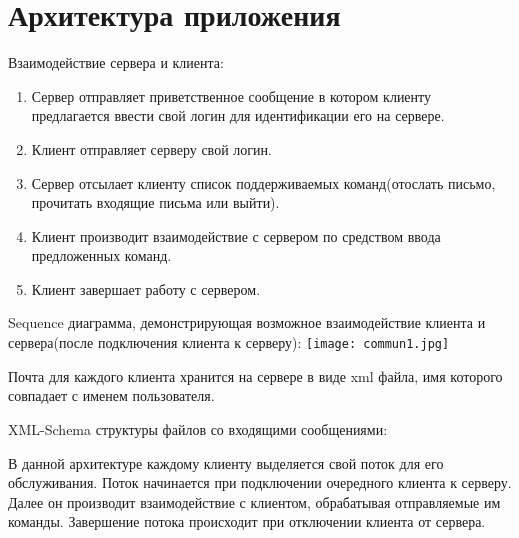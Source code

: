 \documentclass[12pt,a4paper]{report}
\begin{document}
\section{Архитектура приложения}
Взаимодействие сервера и клиента:
\begin{enumerate}
\item Сервер отправляет приветственное сообщение в котором клиенту предлагается ввести свой логин для идентификации его на сервере.
\item Клиент отправляет серверу свой логин.
\item Сервер отсылает клиенту список поддерживаемых команд(отослать письмо, прочитать входящие письма или выйти).
\item Клиент производит взаимодействие с сервером по средством ввода предложенных команд.
\item Клиент завершает работу с сервером.
\end{enumerate}
\pagebreak
\flushleft
Sequence диаграмма, демонстрирующая возможное взаимодействие клиента и сервера(после подключения клиента к серверу):
\linebreak
\center \texttt{[image: commun1.jpg]}
\flushleft

Почта для каждого клиента хранится на сервере в виде xml файла, имя которого совпадает с именем пользователя.

XML-Schema структуры файлов со входящими сообщениями:


В данной архитектуре каждому клиенту выделяется свой поток для его обслуживания. Поток начинается при подключении очередного клиента к серверу. Далее он производит взаимодействие с клиентом, обрабатывая отправляемые им команды. Завершение потока происходит при отключении клиента от сервера.
\end{document}
